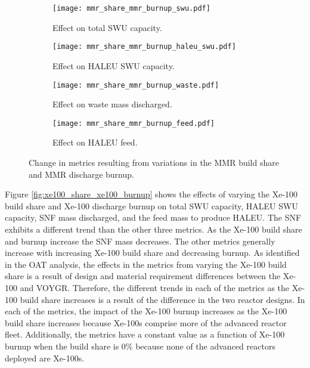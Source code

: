 \begin{figure}
    \ContinuedFloat    
    \begin{subfigure}[t]{0.48\textwidth}
        \centering
        \texttt{[image: mmr\_share\_mmr\_burnup\_swu.pdf]}
        \caption{Effect on total SWU capacity.}
        \label{fig:mmr_share_mmr_burnup_swu}
    \end{subfigure}
    \hfill
    \begin{subfigure}[t]{0.48\textwidth}
        \centering
        \texttt{[image: mmr\_share\_mmr\_burnup\_haleu\_swu.pdf]}
        \caption{Effect on HALEU SWU capacity.}
        \label{fig:mmr_share_mmr_burnup_haleu_swu}
    \end{subfigure}
    
    \begin{subfigure}[t]{0.48\textwidth}
        \centering
        \texttt{[image: mmr\_share\_mmr\_burnup\_waste.pdf]}
        \caption{Effect on waste mass discharged.}
        \label{fig:mmr_share_mmr_burnup_waste}
    \end{subfigure}
    \hfill
    \begin{subfigure}[t]{0.48\textwidth}
        \centering
        \texttt{[image: mmr\_share\_mmr\_burnup\_feed.pdf]}
        \caption{Effect on HALEU feed.}
        \label{fig:mmr_share_mmr_burnup_feed}
    \end{subfigure}
    \caption{Change in metrics resulting from variations in the 
    MMR build share and MMR discharge burnup.}
    \label{fig:mmr_share_mmr_burnup}
\end{figure}

Figure \ref{fig:xe100_share_xe100_burnup} shows the effects of varying 
the Xe-100 build share and Xe-100 discharge burnup on total \gls{SWU}
capacity, \gls{HALEU} \gls{SWU} capacity, \gls{SNF} mass discharged, and
the feed mass to produce \gls{HALEU}. The \gls{SNF} exhibits a different 
trend than the other three metrics. As the Xe-100 build share and 
burnup increase the \gls{SNF} mass decreases. The other metrics generally
increase with increasing Xe-100 build share and decreasing burnup. 
As identified in the \gls{OAT} analysis, the effects in the metrics from 
varying the Xe-100 build share is a result of design and material 
requirement differences between the Xe-100 and VOYGR. Therefore, the 
different trends in each of the metrics as the Xe-100 build share increases 
is a result of the difference in the two reactor designs. 
In each of 
the metrics, the impact of the Xe-100 burnup increases as the 
Xe-100 build share increases because Xe-100s comprise more of 
the advanced reactor fleet. Additionally, the metrics have a constant value 
as a function of Xe-100 burnup when the build share is 0\% because none 
of the advanced reactors deployed are Xe-100s. 

